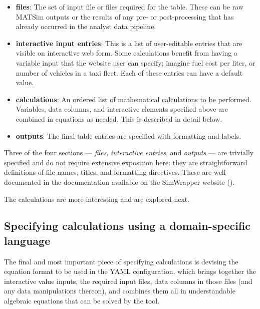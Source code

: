 \begin{itemize}

  \item \textbf{files}: The set of input file or files required for the table. These can be raw MATSim outputs or the results of any pre- or post-processing that has already occurred in the analyst data pipeline.

  \item \textbf{interactive input entries}: This is a list of user-editable entries that are visible on interactive web form. Some calculations benefit from having a variable input that the website user can specify; imagine fuel cost per liter, or number of vehicles in a taxi fleet. Each of these entries can have a default value.

  \item \textbf{calculations}: An ordered list of mathematical calculations to be performed. Variables, data columns, and interactive elements specified above are combined in equations as needed. This is described in detail below.

  \item \textbf{outputs}: The final table entries are specified with formatting and labels.

\end{itemize}

Three of the four sections --- \emph{files}, \emph{interactive entries}, and \emph{outputs} --- are trivially specified and do not require extensive exposition here: they are straightforward definitions of file names, titles, and formatting directives. These are well-documented in the documentation available on the SimWrapper website (\cite{SimWrapperWebsite}).

The calculations are more interesting and are explored next.

\hypertarget{calculation-tables-dsl}{%
\subsection{Specifying calculations using a domain-specific language}\label{calculation-tables-dsl}}

The final and most important piece of specifying calculations is devising the equation format to be used in the YAML configuration, which brings together the interactive value inputs, the required input files, data columns in those files (and any data manipulations thereon), and combines them all in understandable algebraic equations that can be solved by the tool.

